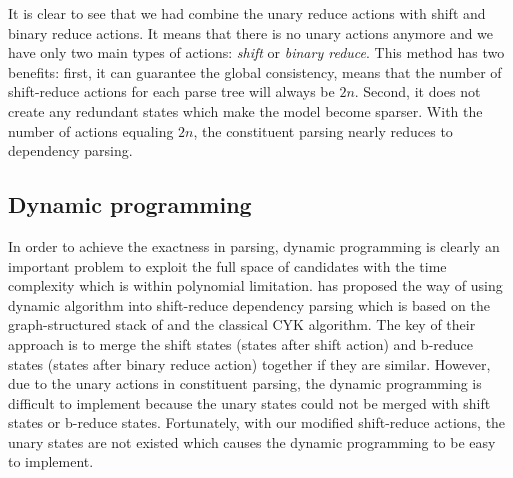 It is clear to see that we had combine the unary reduce actions with shift and binary reduce actions. It means that there is no unary actions anymore and we have only two main types of actions: \textit{shift} or \textit{binary reduce}. This method has two benefits: first, it can guarantee the global consistency, means that the number of shift-reduce actions for each parse tree will always be $2n$. Second, it does not create any redundant states which make the model become sparser. With the number of actions equaling $2n$, the constituent parsing nearly reduces to dependency parsing.

\subsection{Dynamic programming}
In order to achieve the exactness in parsing, dynamic programming is clearly an important problem to exploit the full space of candidates with the time complexity which is within polynomial limitation. \cite{ref:2010Huang} has proposed the way of using dynamic algorithm into shift-reduce dependency parsing which is based on the graph-structured stack  of \cite{ref:1991Tomita} and the classical CYK algorithm. The key of their approach is to merge the shift states (states after shift action) and b-reduce states (states after binary reduce action) together if they are similar. However, due to the unary actions in constituent parsing, the dynamic programming is difficult to implement because the unary states could not be merged with shift states or b-reduce states. Fortunately, with our modified shift-reduce actions, the unary states are not existed which causes the dynamic programming to be easy to implement.
